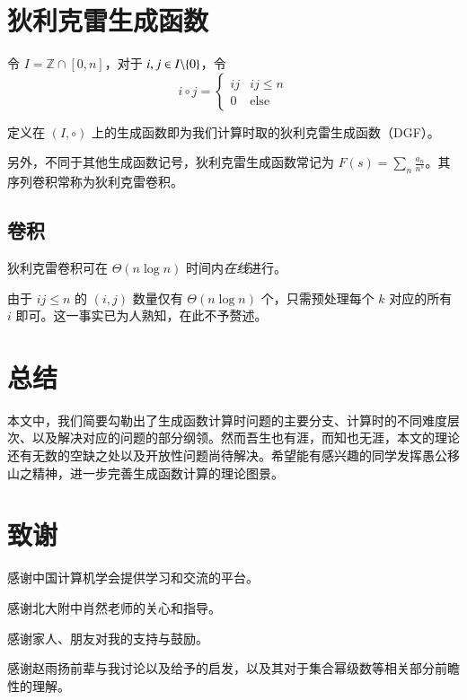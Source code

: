\section{狄利克雷生成函数}

\begin{definition}
令 $I = \mathbb Z \cap [0, n]$，对于 $i,j\in {I \backslash \{0\}}$，令
$$
i\circ j = \begin{cases}
ij & ij \le n\\
0 & \mathrm{else}
\end{cases}
$$

定义在 $(I,\circ)$ 上的生成函数即为我们计算时取的狄利克雷生成函数（DGF）。

另外，不同于其他生成函数记号，狄利克雷生成函数常记为 $F(s) = \sum_n \frac{a_n}{n^s}$。其序列卷积常称为狄利克雷卷积。
\end{definition}

\subsection{卷积}

\begin{theorem}
狄利克雷卷积可在 $\Theta(n\log n)$ 时间内\emph{在线}进行。
\end{theorem}

由于 $ij\le n$ 的 $(i,j)$ 数量仅有 $\Theta(n\log n)$ 个，只需预处理每个 $k$ 对应的所有 $i$ 即可。这一事实已为人熟知，在此不予赘述。

\section{总结}

本文中，我们简要勾勒出了生成函数计算时问题的主要分支、计算时的不同难度层次、以及解决对应的问题的部分纲领。然而吾生也有涯，而知也无涯，本文的理论还有无数的空缺之处以及开放性问题尚待解决。希望能有感兴趣的同学发挥愚公移山之精神，进一步完善生成函数计算的理论图景。

\section*{致谢}

感谢中国计算机学会提供学习和交流的平台。

感谢北大附中肖然老师的关心和指导。

感谢家人、朋友对我的支持与鼓励。

感谢赵雨扬前辈与我讨论以及给予的启发，以及其对于集合幂级数等相关部分前瞻性的理解。

